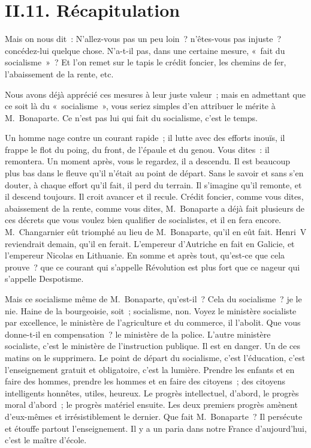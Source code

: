 \documentclass[french,twoside]{book} %
\begin{document}
\section[{II.11. Récapitulation}]{II.11. Récapitulation}

\noindent Mais on nous dit : N’allez-vous pas un peu loin ? n’êtes-vous pas injuste ? concédez-lui quelque chose. N’a-t-il pas, dans une certaine mesure, « fait du socialisme » ? Et l’on remet sur le tapis le crédit foncier, les chemins de fer, l’abaissement de la rente, etc.\par
Nous avons déjà apprécié ces mesures à leur juste valeur ; mais en admettant que ce soit là du « socialisme », vous seriez simples d’en attribuer le mérite à M. Bonaparte. Ce n’est pas lui qui fait du socialisme, c’est le temps.\par
Un homme nage contre un courant rapide ; il lutte avec des efforts inouïs, il frappe le flot du poing, du front, de l’épaule et du genou. Vous dites : il remontera. Un moment après, vous le regardez, il a descendu. Il est beaucoup plus bas dans le fleuve qu’il n’était au point de départ. Sans le savoir et sans s’en douter, à chaque effort qu’il fait, il perd du terrain. Il s’imagine qu’il remonte, et il descend toujours. Il croit avancer et il recule. Crédit foncier, comme vous dites, abaissement de la rente, comme vous dites, M. Bonaparte a déjà fait plusieurs de ces décrets que vous voulez bien qualifier de socialistes, et il en fera encore. M. Changarnier eût triomphé au lieu de M. Bonaparte, qu’il en eût fait. Henri V reviendrait demain, qu’il en ferait. L’empereur d’Autriche en fait en Galicie, et l’empereur Nicolas en Lithuanie. En somme et après tout, qu’est-ce que cela prouve ? que ce courant qui s’appelle Révolution est plus fort que ce nageur qui s’appelle Despotisme.\par
Mais ce socialisme même de M. Bonaparte, qu’est-il ? Cela du socialisme ? je le nie. Haine de la bourgeoisie, soit ; socialisme, non. Voyez le ministère socialiste par excellence, le ministère de l’agriculture et du commerce, il l’abolit. Que vous donne-t-il en compensation ? le ministère de la police. L’autre ministère socialiste, c’est le ministère de l’instruction publique. Il est en danger. Un de ces matins on le supprimera. Le point de départ du socialisme, c’est l’éducation, c’est l’enseignement gratuit et obligatoire, c’est la lumière. Prendre les enfants et en faire des hommes, prendre les hommes et en faire des citoyens ; des citoyens intelligents honnêtes, utiles, heureux. Le progrès intellectuel, d’abord, le progrès moral d’abord ; le progrès matériel ensuite. Les deux premiers progrès amènent d’eux-mêmes et irrésistiblement le dernier. Que fait M. Bonaparte ? Il persécute et étouffe partout l’enseignement. Il y a un paria dans notre France d’aujourd’hui, c’est le maître d’école.\par
\end{document}
